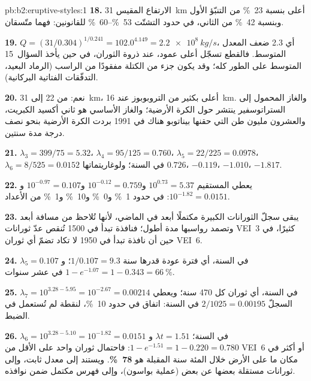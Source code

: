 \begin{solution}{pb:b2:eruptive-styles:1}
\textbf{18.} الارتفاع المقيس \qty{31}{km} أعلى بنسبة \qty{23}{\percent} من التنبّؤ
الأول وبنسبة \qty{42}{\percent} من الثاني، في حدود التشتّت
\qtyrange{53}{60}{\percent} للقانونين: فهما متّسقان.

\textbf{19.} $Q = (31/0.304)^{1/0.241} = 102.0^{4.149} = \qty{2.2e8}{kg/s}$، أي 2.3 ضعف
المعدل المتوسط. فالقطع تسجّل أعلى عمود، عند ذروة
الثوران، في حين يأخذ السؤال~15 المتوسط على الطور كله؛ وقد يكون جزء من الكتلة
مفقودًا من الراسب (الرماد البعيد، التدفّقات الفتاتية البركانية).

\textbf{20.} نعم: من 22 إلى \qty{31}{km}، أعلى بكثير من التروبوبوز عند \qty{16}{km}.
والغاز المحمول إلى الستراتوسفير ينتشر حول الكرة الأرضية؛ والغاز الأساسي هو
ثاني أكسيد الكبريت، والعشرون مليون طن التي حقنها بيناتوبو هناك في 1991
بردت الكرة الأرضية بنحو نصف درجة مدة سنتين.

\textbf{21.} $\lambda_3 = 399/75 = 5.32$، $\lambda_4 = 95/125 = 0.760$، $\lambda_5 = 22/225 =
0.0978$، $\lambda_6 = 8/525 = 0.0152$ في السنة؛ ولوغاريتماتها $0.726$، $-0.119$، $-1.010$،
$-1.817$.

\textbf{22.} يعطي المستقيم $10^{0.73} = 5.37$ و$10^{-0.12} = 0.759$ و$10^{-0.97} =
0.107$ و$10^{-1.82} = 0.0151$: في حدود \qty{1}{\percent} و\qty{0}{\percent}
و\qty{10}{\percent} و\qty{1}{\percent} من الأعداد.

\textbf{23.} يبقى سجلّ الثورانات الكبيرة مكتملًا أبعد في الماضي،
لأنها تُلاحظ من مسافة أبعد وتصمد رواسبها مدة أطول؛ فنافذة
تبدأ في 1500 تُنقص عدّ ثورانات VEI~3 كثيرًا، في حين أن نافذة
تبدأ في 1950 لا تكاد تضمّ أي ثوران VEI~6.

\textbf{24.} $\lambda_5 = \num{0.107}$ في السنة، أي فترة عودة قدرها $1/0.107 =
\num{9.3}\text{ سنة}$؛ و$1 - e^{-1.07} = 1 - 0.343 = \qty{66}{\percent}$ في عشر سنوات.

\textbf{25.} $\lambda_7 = 10^{3.28 - 5.95} = 10^{-2.67} = 0.00214$ في السنة، أي ثوران كل
470 سنة؛ ويعطي السجلّ $2/1025 = 0.00195$ في السنة: اتفاق في حدود
\qty{10}{\percent}، لنقطة لم تُستعمل في الضبط.

\textbf{26.} $\lambda_6 = 10^{3.28 - 5.10} = 10^{-1.82} = 0.0151$ في السنة؛ $\lambda t = 1.51$
و$1 - e^{-1.51} = 1 - 0.220 = 0.780$: فاحتمال ثوران واحد على الأقل
من VEI~6 أو أكثر في مكان ما على الأرض خلال المئة سنة المقبلة هو
\textbf{\qty[text-series-to-math=true]{78}{\percent}}. ويستند إلى معدل ثابت،
وإلى ثورانات مستقلة بعضها عن بعض (عملية بواسون)، وإلى
فهرس مكتمل ضمن نوافذه.
\end{solution}
